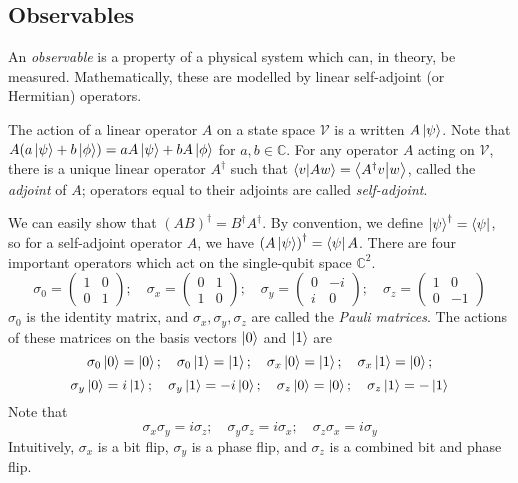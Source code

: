 \subsection{Observables}
An \emph{observable} is a property of a physical system which can, in theory, be measured.
Mathematically, these are modelled by linear self-adjoint (or Hermitian) operators.

The action of a linear operator \( A \) on a state space \( \mathcal V \) is a written \( A \ket{\psi} \).
Note that \( A \qty(a \ket{\psi} + b \ket{\phi}) = a A \ket{\psi} + b A \ket{\phi} \) for \( a, b \in \mathbb C \).
For any operator \( A \) acting on \( \mathcal V \), there is a unique linear operator \( A^\dagger \) such that \( \ip{v}{Aw} = \ip{A^\dagger v}{w} \), called the \emph{adjoint} of \( A \); operators equal to their adjoints are called \emph{self-adjoint}.

We can easily show that \( (AB)^\dagger = B^\dagger A^\dagger \).
By convention, we define \( \ket{\psi}^\dagger = \bra{\psi} \), so for a self-adjoint operator \( A \), we have \( \qty(A \ket{\psi})^\dagger = \bra{\psi} A \).
There are four important operators which act on the single-qubit space \( \mathbb C^2 \).
\[ \sigma_0 = \begin{pmatrix}
    1 & 0 \\
    0 & 1
\end{pmatrix};\quad \sigma_x = \begin{pmatrix}
    0 & 1 \\
    1 & 0
\end{pmatrix};\quad \sigma_y = \begin{pmatrix}
    0 & -i \\
    i & 0
\end{pmatrix};\quad \sigma_z = \begin{pmatrix}
    1 & 0 \\
    0 & -1
\end{pmatrix} \]
\( \sigma_0 \) is the identity matrix, and \( \sigma_x, \sigma_y, \sigma_z \) are called the \emph{Pauli matrices}.
The actions of these matrices on the basis vectors \( \ket{0} \) and \( \ket{1} \) are
\[ \sigma_0\ket{0} = \ket{0};\quad \sigma_0\ket{1} = \ket{1};\quad \sigma_x\ket{0} = \ket{1};\quad \sigma_x\ket{1} = \ket{0}; \]
\[ \sigma_y\ket{0} = i\ket{1};\quad \sigma_y\ket{1} = -i\ket{0};\quad \sigma_z\ket{0} = \ket{0};\quad \sigma_z\ket{1} = -\ket{1} \]
Note that
\[ \sigma_x \sigma_y = i \sigma_z;\quad \sigma_y \sigma_z = i \sigma_x;\quad \sigma_z \sigma_x = i\sigma_y \]
Intuitively, \( \sigma_x \) is a bit flip, \( \sigma_y \) is a phase flip, and \( \sigma_z \) is a combined bit and phase flip.

